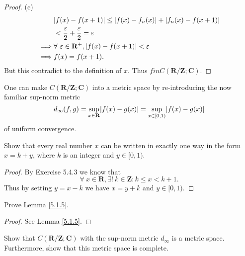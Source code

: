 \begin{proof}{(c)}
\begin{align*}
                 & \abs*{f(x) - f(x + 1)} \leq \abs*{f(x) - f_n(x)} + \abs*{f_n(x) - f(x + 1)}                                                                           \\
                 & < \frac{\varepsilon}{2} + \frac{\varepsilon}{2} = \varepsilon                                                                                         \\
        \implies & \forall\ \varepsilon \in \mathbf{R}^+, \abs*{f(x) - f(x + 1)} < \varepsilon                                                                           \\
        \implies & f(x) = f(x + 1).
    \end{align*}
    But this contradict to the definition of \(x\).
    Thus \(f in C(\mathbf{R} / \mathbf{Z} ; \mathbf{C})\).
\end{proof}

\begin{note}
    One can make \(C(\mathbf{R} / \mathbf{Z} ; \mathbf{C})\) into a metric space by re-introducing the now familiar sup-norm metric
    \[
        d_\infty(f, g) = \sup_{x \in \mathbf{R}} \abs*{f(x) - g(x)} = \sup_{x \in [0, 1)} \abs*{f(x) - g(x)}
    \]
    of uniform convergence.
\end{note}

\exercisesection

\begin{exercise}\label{ex 5.1.1}
    Show that every real number \(x\) can be written in exactly one way in the form \(x = k + y\), where \(k\) is an integer and \(y \in [0, 1)\).
\end{exercise}

\begin{proof}
    By Exercise 5.4.3 we know that
    \[
        \forall\ x \in \mathbf{R}, \exists!\ k \in \mathbf{Z} : k \leq x < k + 1.
    \]
    Thus by setting \(y = x - k\) we have \(x = y + k\) and \(y \in [0, 1)\).
\end{proof}

\begin{exercise}\label{ex 5.1.2}
    Prove Lemma \ref{5.1.5}.
\end{exercise}

\begin{proof}
    See Lemma \ref{5.1.5}.
\end{proof}

\begin{exercise}\label{ex 5.1.3}
    Show that \(C(\mathbf{R} / \mathbf{Z} ; \mathbf{C})\) with the sup-norm metric \(d_\infty\) is a metric space.
    Furthermore, show that this metric space is complete.
\end{exercise}